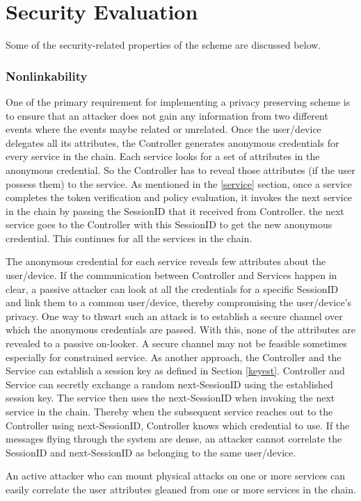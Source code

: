 \documentclass[journal]{IEEEtran}
\begin{document}
\section{Security Evaluation} \label{seceval}
Some of the security-related properties of the scheme are discussed below.
\subsubsection{Nonlinkability}
One of the primary requirement for implementing a privacy preserving scheme is to ensure that an attacker does not gain any information from two different events where the events maybe related or unrelated. Once the user/device delegates all its attributes, the Controller generates anonymous credentials for every service in the chain. Each service looks for a set of attributes in the anonymous credential. So the Controller has to reveal those attributes (if the user possess them) to the service. As mentioned in the \ref{service} section, once a service completes the token verification and policy evaluation, it invokes the next service in the chain by passing the SessionID that it received from Controller. the next service goes to the Controller with this SessionID to get the new anonymous credential. This continues for all the services in the chain.

The anonymous credential for each service reveals few attributes about the user/device. If the communication between Controller and Services happen in clear, a passive attacker can look at all the credentials for a specific SessionID and link them to a common user/device, thereby compromising the user/device's privacy. One way to thwart such an attack is to establish a secure channel over which the anonymous credentials are passed. With this, none of the attributes are revealed to a passive on-looker. A secure channel may not be feasible sometimes especially for constrained service. As another approach, the Controller and the Service can establish a session key as defined in Section \ref{keyest}. Controller and Service can secretly exchange a random next-SessionID using the established session key. The service then uses the next-SessionID when invoking the next service in the chain.  Thereby when the subsequent service reaches out to the Controller using next-SessionID, Controller knows which credential to use. If the messages flying through the system are dense, an attacker cannot correlate the SessionID and next-SessionID as belonging to the same user/device.

An active attacker who can mount physical attacks on one or more services can easily correlate the user attributes gleaned from one or more services in the chain.
 
\end{document}
